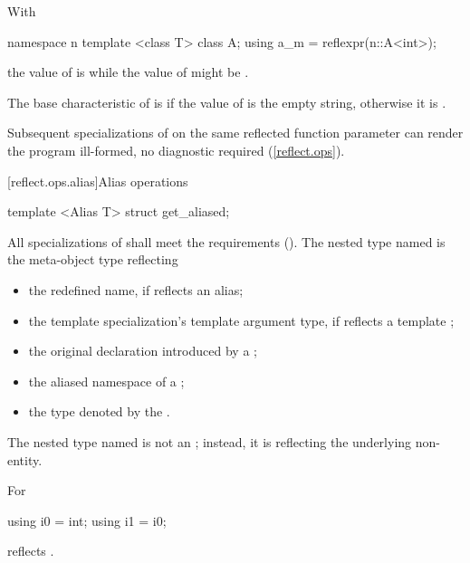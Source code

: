 \begin{std.txt}
\begin{itemdescr}
\pnum
\begin{note}
With
\begin{codeblock}
namespace n { template <class T> class A; }
using a_m = reflexpr(n::A<int>);
\end{codeblock}
the value of  is  while the value of  might be .
\end{note}

\pnum
The base characteristic of  is  if the value of  is the empty string, otherwise it is .

\pnum
Subsequent specializations of  on the same reflected
function parameter can render the program ill-formed, no diagnostic required
(\ref{reflect.ops}).

\end{itemdescr}

\end{std.txt}


[reflect.ops.alias]{Alias operations}

\begin{std.txt}\color{addclr}

\begin{itemdecl}
template <Alias T> struct get_aliased;
\end{itemdecl}

\begin{itemdescr}
\pnum
All specializations of  shall meet the  requirements (). The nested type named  is the  meta-object type reflecting
\begin{itemize}
\item the redefined name, if  reflects an alias;
\item the template specialization's template argument type, if  reflects a template ;
\item the original declaration introduced by a ;
\item the aliased namespace of a ;
\item the type denoted by the .
\end{itemize}

\pnum
The nested type named  is not an ; instead, it is reflecting the underlying non- entity.

\pnum
\begin{example}
For
\begin{codeblock}
using i0 = int; using i1 = i0;
\end{codeblock}
 reflects .
\end{example}

\end{itemdescr}
\end{std.txt}

